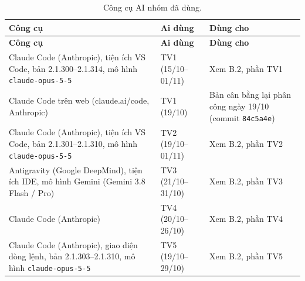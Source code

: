 \begin{longtable}[]{@{}
  >{\raggedright\arraybackslash}p{}
  >{\raggedright\arraybackslash}p{}
  >{\raggedright\arraybackslash}p{}@{}}
\caption{ Công cụ AI nhóm đã dùng.}\tabularnewline
\toprule\noalign{}
\rowcolor{tablehead}\begin{minipage}[b]{\linewidth}\raggedright
\textbf{Công cụ}
\end{minipage} & \begin{minipage}[b]{\linewidth}\raggedright
\textbf{Ai dùng}
\end{minipage} & \begin{minipage}[b]{\linewidth}\raggedright
\textbf{Dùng cho}
\end{minipage} \\
\midrule\noalign{}
\endfirsthead
\toprule\noalign{}
\rowcolor{tablehead}\begin{minipage}[b]{\linewidth}\raggedright
\textbf{Công cụ}
\end{minipage} & \begin{minipage}[b]{\linewidth}\raggedright
\textbf{Ai dùng}
\end{minipage} & \begin{minipage}[b]{\linewidth}\raggedright
\textbf{Dùng cho}
\end{minipage} \\
\midrule\noalign{}
\endhead
\bottomrule\noalign{}
\endlastfoot
Claude Code (Anthropic), tiện ích VS Code, bản 2.1.300--2.1.314, mô hình \texttt{claude-\allowbreak{}opus-\allowbreak{}5-\allowbreak{}5} & TV1 (15/10--01/11) & Xem B.2, phần TV1 \\
\rowrule
Claude Code trên web (claude.ai/code, Anthropic) & TV1 (19/10) & Bản cân bằng lại phân công ngày 19/10 (commit \texttt{84c5a4e}) \\
\rowrule
Claude Code (Anthropic), tiện ích VS Code, bản 2.1.301--2.1.310, mô hình \texttt{claude-\allowbreak{}opus-\allowbreak{}5-\allowbreak{}5} & TV2 (19/10--01/11) & Xem B.2, phần TV2 \\
\rowrule
Antigravity (Google DeepMind), tiện ích IDE, mô hình Gemini (Gemini 3.8 Flash / Pro) & TV3 (21/10--31/10) & Xem B.2, phần TV3 \\
\rowrule
Claude Code (Anthropic) & TV4 (20/10--26/10) & Xem B.2, phần TV4 \\
\rowrule
Claude Code (Anthropic), giao diện dòng lệnh, bản 2.1.303--2.1.310, mô hình \texttt{claude-\allowbreak{}opus-\allowbreak{}5-\allowbreak{}5} & TV5 (19/10--29/10) & Xem B.2, phần TV5 \\
\end{longtable}

